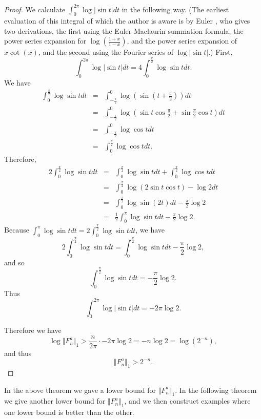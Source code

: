 \documentclass{article}
\newcommand{\norm}[1]{\Vert #1 \Vert}
\begin{document}
\begin{proof}
We calculate  $\int_0^{2\pi} \log |\sin t|dt$ in the following way. (The earliest evaluation of this integral of which the author is aware
is by Euler \cite{E393}, who gives two derivations, the first using the Euler-Maclaurin summation formula, the power
series expansion for $\log\left( \frac{1+x}{1-x} \right)$, and the power series expansion of $x\cot(x)$,
and the second using the Fourier series of
$\log | \sin t|$.)
First, 
\[
\int_0^{2\pi} \log |\sin t|dt=4\int_0^{\frac{\pi}{2}} \log \sin t dt.
\]
We have
\begin{eqnarray*}
\int_0^{\frac{\pi}{2}} \log \sin t dt&=&\int_{-\frac{\pi}{2}}^0 \log\left( \sin\left( t+\frac{\pi}{2} \right) \right) dt\\
&=&\int_{-\frac{\pi}{2}}^0 \log\left(\sin t \cos \frac{\pi}{2}+\sin \frac{\pi}{2}\cos t \right) dt\\
&=&\int_{-\frac{\pi}{2}}^0 \log \cos t dt\\
&=&\int_0^{\frac{\pi}{2}} \log \cos t dt.
\end{eqnarray*}
Therefore,
\begin{eqnarray*}
2\int_0^{\frac{\pi}{2}} \log \sin t dt &=&\int_0^{\frac{\pi}{2}} \log \sin t dt+ \int_0^{\frac{\pi}{2}} \log \cos t dt\\
&=&\int_0^{\frac{\pi}{2}} \log \left( 2 \sin t \cos t \right)-\log 2 dt\\
&=&\int_0^{\frac{\pi}{2}} \log \sin(2t) dt -\frac{\pi}{2} \log 2\\
&=&\frac{1}{2} \int_0^{\pi} \log \sin t dt -\frac{\pi}{2} \log 2.
\end{eqnarray*}
Because $\int_0^\pi \log \sin t dt=2\int_0^{\frac{\pi}{2}} \log \sin t dt$, we have
\[
2\int_0^{\frac{\pi}{2}} \log \sin t dt=\int_0^{\frac{\pi}{2}} \log \sin t dt-\frac{\pi}{2}\log 2,
\]
and so
\[
\int_0^{\frac{\pi}{2}} \log \sin t dt=-\frac{\pi}{2}\log 2. 
\]
Thus
\[
\int_0^{2\pi} \log |\sin t|dt=-2\pi \log 2.
\]

Therefore we have
\[
\log \norm{F_n^a}_1 > \frac{n}{2\pi} \cdot -2 \pi \log 2 = -n\log 2 = \log(2^{-n}),
\]
and thus
\[
\norm{F_n^a}_1 > 2^{-n}.
\]
\end{proof}

In the above theorem we gave a lower bound for $\norm{F_n^a}_1$. In the following theorem we give another lower bound for $\norm{F_n^a}_1$, and we then construct
examples where one lower bound is better than the other.
\end{document}
